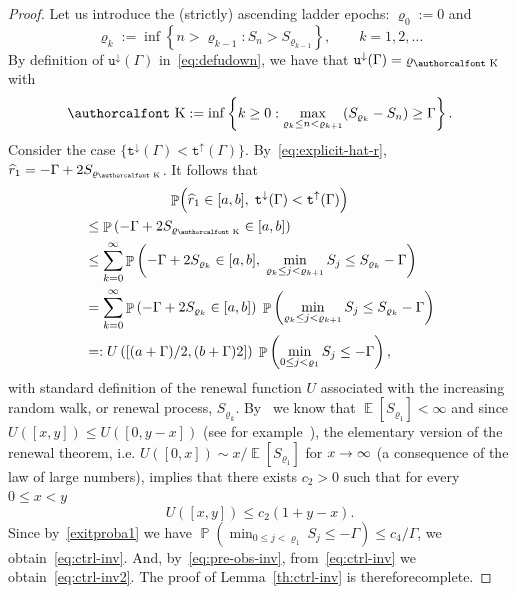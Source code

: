 \documentclass[10pt]{amsart}
\theoremstyle{definition}\newtheorem{defi}[theo]{Definition}\newtheorem{rema}[theo]{Remark}\newtheorem{exam}[theo]{Example}\newtheorem{exem}[theo]{Example}\newtheorem{nota}[theo]{Notation}
\renewcommand{\mathcal}[1]{\text{\authorcalfont #1}}
\newcommand{\gG}{\Gamma}
\renewcommand*\ss{\mathtt{u}}
\newcommand{\ttt}{\mathtt{t}}
\newcommand{\ttdown}{\ttt^\downarrow}
\newcommand{\ttup}{\ttt^\uparrow}
\newcommand{\tudown}{\ss^\downarrow}
\DeclareMathOperator{\p}{\mathbb{P}}
\DeclareMathOperator{\e}{\mathbb{E}}
\newcommand{\clK}{\mathcal{K}}
\renewcommand*{\to}{\mathchoice{\longrightarrow}{\rightarrow}{\rightarrow}{\rightarrow}}
\begin{document}
\begin{proof}
Let us introduce the (strictly) ascending ladder epochs: $\varrho_0:=0$ and
\begin{equation}\label{def-rhok}
\varrho_k:= \inf\left\{n> \varrho_{k-1}: S_n > S_{\varrho_{k-1}}\right\}, \qquad k=1, 2, \dots
\end{equation}
By definition of $\tudown(\gG)$ in~\eqref{eq:defudown}, we have that $\tudown(\gG)=\varrho_ {\clK}$ with
\begin{equation}\label{j*}
{\clK} := \inf\left\{k\ge 0: \max_{\varrho_k \le n < \varrho_{k+1}} (S_{\varrho_k}-S_n) \ge \Gamma\right\}.
\end{equation}
Consider the case $\{\ttdown(\Gamma)<\ttup(\Gamma)\}$. By~\eqref{eq:explicit-hat-r}, $\widehat r_1= -\Gamma+ 2 S_{\varrho_{\clK}}$. It follows that
\begin{multline}
\p\Bigl( \widehat r_1\in [a, b], \; \ttdown(\Gamma)<\ttup(\Gamma)\Bigr) \\
\begin{aligned}
&\le
\p\left(-\gG+ 2 S_{\varrho_{\clK}} \in [a, b]\right)\\
&\le
\sum_{k=0}^\infty \p\left(-\Gamma+ 2 S_{\varrho_k} \in [a, b],\; \min_{\varrho_k \le j < \varrho_{k+1}} S_j \le S_{\varrho_k} - \Gamma\right)
\\ &=
\sum_{k=0}^\infty \p\left(-\Gamma+ 2 S_{\varrho_k} \in [a, b]\right)\; \p\left(\min_{ \varrho_{k}\le j < \varrho_{k+1}} S_j \le S_{\varrho_k} - \Gamma\right)
\\
&=: U\left(\left[(a+\Gamma)/2, (b+\Gamma)2\right]\right)\; \p\left(\min_{0\le j < \varrho_1} S_j \le - \Gamma\right),
\end{aligned}
\end{multline}
with standard definition of the renewal function $U$ associated with the increasing random walk, or renewal process, $S_{\varrho_k}$. By~\cite[Chapter~IV, p.~199]{cf:Spitzer} we know that $\e[S_{\varrho_1}]<\infty$ and since $U([x, y]) \le U([0, y-x])$ (see for example~\cite[Theorem~2.4, Chapter V]{cf:Asm}), the elementary version of the {renewal theorem}, i.e. $U([0,x])\sim x/\e[S_{\varrho_1}]$ for $x \to \infty$ (a consequence of the {law of large numbers}), implies that there exists $c_{2}>0$ such that for every $0\le x <y$
\begin{equation}
U([x, y])\le c_{2} (1+ y-x).
\end{equation}
Since by~\eqref{exitproba1} we have $\p(\min_{0\le j < \varrho_1} S_j \le - \Gamma) \le {c_4}/{\Gamma}$, we obtain~\eqref{eq:ctrl-inv}. And, by~\eqref{eq:pre-obs-inv}, from~\eqref{eq:ctrl-inv} we obtain~\eqref{eq:ctrl-inv2}. The proof of Lemma~\ref{th:ctrl-inv} is therefore\linebreak complete.
\end{proof}
\end{document}
